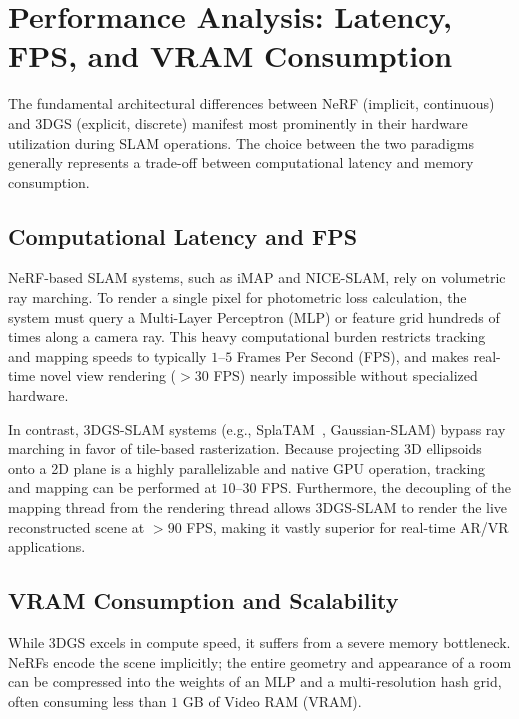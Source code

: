 \section{Performance Analysis: Latency, FPS, and VRAM Consumption}
\label{sec:analysis}

The fundamental architectural differences between NeRF (implicit, continuous) and 3DGS (explicit, discrete) manifest most prominently in their hardware utilization during SLAM operations. The choice between the two paradigms generally represents a trade-off between computational latency and memory consumption.

\subsection{Computational Latency and FPS}
NeRF-based SLAM systems, such as iMAP and NICE-SLAM, rely on volumetric ray marching. To render a single pixel for photometric loss calculation, the system must query a Multi-Layer Perceptron (MLP) or feature grid hundreds of times along a camera ray. This heavy computational burden restricts tracking and mapping speeds to typically $1$--$5$ Frames Per Second (FPS), and makes real-time novel view rendering ($>30$ FPS) nearly impossible without specialized hardware.

In contrast, 3DGS-SLAM systems (e.g., SplaTAM~\cite{keetha2024splatam}, Gaussian-SLAM) bypass ray marching in favor of tile-based rasterization. Because projecting 3D ellipsoids onto a 2D plane is a highly parallelizable and native GPU operation, tracking and mapping can be performed at $10$--$30$ FPS. Furthermore, the decoupling of the mapping thread from the rendering thread allows 3DGS-SLAM to render the live reconstructed scene at $>90$ FPS, making it vastly superior for real-time AR/VR applications.

\subsection{VRAM Consumption and Scalability}
While 3DGS excels in compute speed, it suffers from a severe memory bottleneck. NeRFs encode the scene implicitly; the entire geometry and appearance of a room can be compressed into the weights of an MLP and a multi-resolution hash grid, often consuming less than $1$ GB of Video RAM (VRAM).

